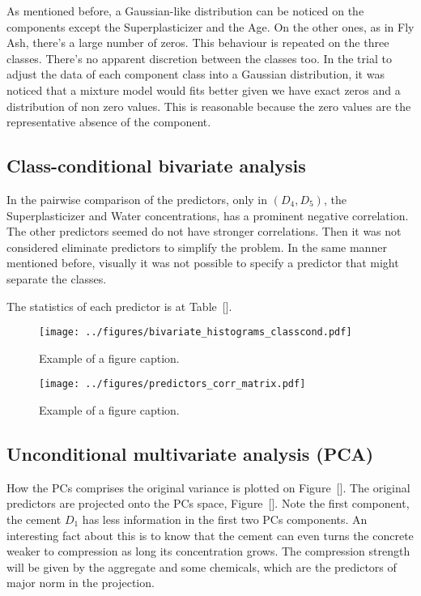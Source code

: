 \documentclass[conference]{IEEEtran}
\begin{document}
As mentioned before, a Gaussian-like distribution can be noticed on the components except the Superplasticizer and the Age. On the other ones, as in Fly Ash, there's a large number of zeros. This behaviour is repeated on the three classes. There's no apparent discretion between the classes too. In the trial to adjust the data of each component class into a Gaussian distribution, it was noticed that a mixture model would fits better given we have exact zeros and a distribution of non zero values. This is reasonable because the zero values are the representative absence of the component.

\subsection{Class-conditional bivariate analysis}

In the pairwise comparison of the predictors, only in $(D_4,D_5)$, the Superplasticizer and Water concentrations, has a prominent negative correlation. The other predictors seemed do not have stronger correlations. Then it was not considered eliminate predictors to simplify the problem. In the same manner mentioned before, visually it was not possible to specify a predictor that might separate the classes.

The statistics of each predictor is at Table~[].

\begin{figure}[htbp]
\centerline{\texttt{[image: ../figures/bivariate\_histograms\_classcond.pdf]}}
\caption{Example of a figure caption.}
\end{figure}

\begin{figure}[htbp]
\centering
\texttt{[image: ../figures/predictors\_corr\_matrix.pdf]}
\caption{Example of a figure caption.}
\label{fig}
\end{figure}

\subsection{Unconditional multivariate analysis (PCA)}

How the PCs comprises the original variance is plotted on Figure~[]. The original predictors are projected onto the PCs space, Figure~[]. Note the first component, the cement $D_1$ has less information in the first two PCs components. An interesting fact about this is to know that the cement can even turns the concrete weaker to compression as long its concentration grows. The compression strength will be given by the aggregate and some chemicals, which are the predictors of major norm in the projection.
\end{document}
